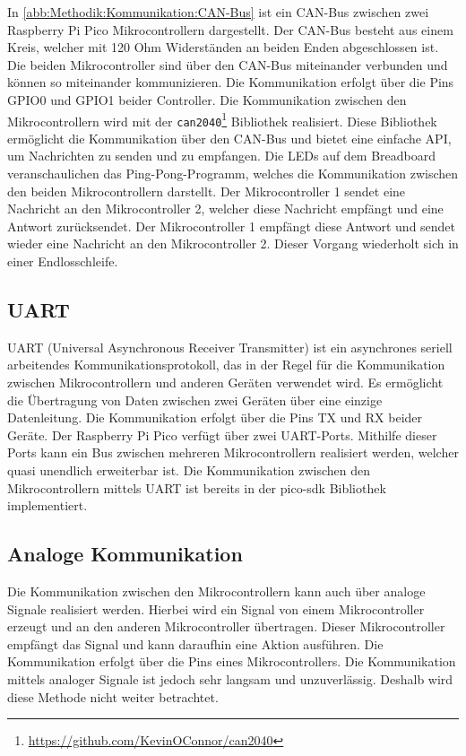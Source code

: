 In \autoref{abb:Methodik:Kommunikation:CAN-Bus} ist ein CAN-Bus zwischen zwei Raspberry Pi Pico Mikrocontrollern dargestellt. Der CAN-Bus besteht aus einem Kreis, welcher mit 120 Ohm Widerständen an beiden Enden abgeschlossen ist. Die beiden Mikrocontroller sind über den CAN-Bus miteinander verbunden und können so miteinander kommunizieren. Die Kommunikation erfolgt über die Pins GPIO0 und GPIO1 beider Controller. Die Kommunikation zwischen den Mikrocontrollern wird mit der \lstinline{can2040}\footnote{\url{https://github.com/KevinOConnor/can2040}} Bibliothek realisiert.
Diese Bibliothek ermöglicht die Kommunikation über den CAN-Bus und bietet eine einfache API, um Nachrichten zu senden und zu empfangen. Die LEDs auf dem Breadboard veranschaulichen das Ping-Pong-Programm, welches die Kommunikation zwischen den beiden Mikrocontrollern darstellt. Der Mikrocontroller 1 sendet eine Nachricht an den Mikrocontroller 2, welcher diese Nachricht empfängt und eine Antwort zurücksendet. Der Mikrocontroller 1 empfängt diese Antwort und sendet wieder eine Nachricht an den Mikrocontroller 2. Dieser Vorgang wiederholt sich in einer Endlosschleife.

\subsection{UART}\label{text:Methodik:Kommunikation:UART}

UART (Universal Asynchronous Receiver Transmitter) ist ein asynchrones seriell arbeitendes Kommunikationsprotokoll, das in der Regel für die Kommunikation zwischen Mikrocontrollern und anderen Geräten verwendet wird. Es ermöglicht die Übertragung von Daten zwischen zwei Geräten über eine einzige Datenleitung. Die Kommunikation erfolgt über die Pins TX und RX beider Geräte.
\newline
Der Raspberry Pi Pico verfügt über zwei UART-Ports. Mithilfe dieser Ports kann ein Bus zwischen mehreren Mikrocontrollern realisiert werden, welcher quasi unendlich erweiterbar ist. Die Kommunikation zwischen den Mikrocontrollern mittels UART ist bereits in der pico-sdk Bibliothek implementiert.

\subsection{Analoge Kommunikation}\label{text:Methodik:Kommunikation:Analoge-Kommunikation}

Die Kommunikation zwischen den Mikrocontrollern kann auch über analoge Signale realisiert werden. Hierbei wird ein Signal von einem Mikrocontroller erzeugt und an den anderen Mikrocontroller übertragen. Dieser Mikrocontroller empfängt das Signal und kann daraufhin eine Aktion ausführen. Die Kommunikation erfolgt über die Pins eines Mikrocontrollers. Die Kommunikation mittels analoger Signale ist jedoch sehr langsam und unzuverlässig. Deshalb wird diese Methode nicht weiter betrachtet.

